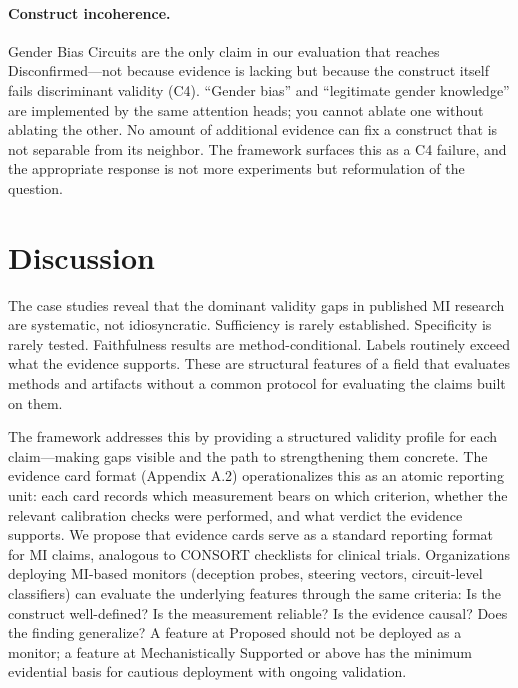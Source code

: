 \documentclass{article}
\begin{document}
\paragraph{Construct incoherence.} Gender Bias Circuits are the only claim in our evaluation that reaches Disconfirmed---not because evidence is lacking but because the construct itself fails discriminant validity (C4). ``Gender bias'' and ``legitimate gender knowledge'' are implemented by the same attention heads; you cannot ablate one without ablating the other. No amount of additional evidence can fix a construct that is not separable from its neighbor. The framework surfaces this as a C4 failure, and the appropriate response is not more experiments but reformulation of the question.

\section{Discussion}
\label{sec:discussion}

The case studies reveal that the dominant validity gaps in published MI research are systematic, not idiosyncratic. Sufficiency is rarely established. Specificity is rarely tested. Faithfulness results are method-conditional. Labels routinely exceed what the evidence supports. These are structural features of a field that evaluates methods and artifacts without a common protocol for evaluating the claims built on them.

The framework addresses this by providing a structured validity profile for each claim---making gaps visible and the path to strengthening them concrete. The evidence card format (Appendix A.2) operationalizes this as an atomic reporting unit: each card records which measurement bears on which criterion, whether the relevant calibration checks were performed, and what verdict the evidence supports. We propose that evidence cards serve as a standard reporting format for MI claims, analogous to CONSORT checklists for clinical trials. Organizations deploying MI-based monitors (deception probes, steering vectors, circuit-level classifiers) can evaluate the underlying features through the same criteria: Is the construct well-defined? Is the measurement reliable? Is the evidence causal? Does the finding generalize? A feature at Proposed should not be deployed as a monitor; a feature at Mechanistically Supported or above has the minimum evidential basis for cautious deployment with ongoing validation.
\end{document}
